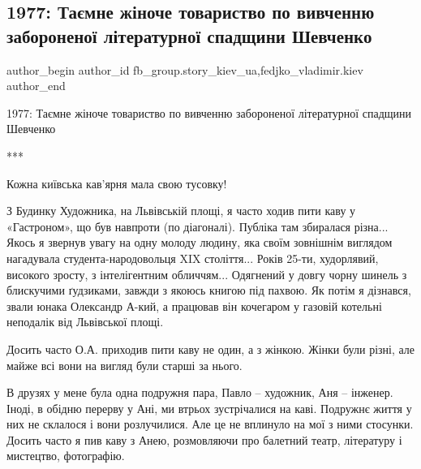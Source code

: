  
 
 
 
 
 
\subsection{1977: Таємне жіноче товариство по вивченню забороненої літературної спадщини Шевченко}
\label{sec:20_11_2021.fb.fb_group.story_kiev_ua.3.1977_nasledie_shevchenko}
 
\ifcmt
 author_begin
   author_id fb_group.story_kiev_ua,fedjko_vladimir.kiev
 author_end
\fi

1977: Таємне жіноче товариство по вивченню забороненої літературної спадщини Шевченко

***

Кожна київська кав’ярня мала свою тусовку! 

З Будинку Художника, на Львівській площі, я часто ходив пити каву у
«Гастроном», що був навпроти (по діагоналі). Публіка там збиралася різна... Якось
я звернув увагу на одну молоду людину, яка своїм зовнішнім виглядом нагадувала
студента-народовольця XIX століття... Років 25-ти, худорлявий, високого зросту, з
інтелігентним обличчям... Одягнений у довгу чорну шинель з блискучими ґудзиками,
завжди з якоюсь книгою під пахвою. Як потім я дізнався, звали юнака Олександр
А-кий, а працював він кочегаром у газовій котельні неподалік від Львівської
площі. 

Досить часто О.А. приходив пити каву не один, а з жінкою. Жінки були різні, але
майже всі вони на вигляд були старші за нього. 

В друзях у мене була одна подружня пара, Павло – художник, Аня – інженер.
Іноді, в обідню перерву у Ані, ми втрьох зустрічалися на каві. Подружнє життя у
них не склалося і вони розлучилися. Але це не вплинуло на мої з ними стосунки.
Досить часто я пив каву з Анею, розмовляючи про балетний театр, літературу і
мистецтво, фотографію. 

